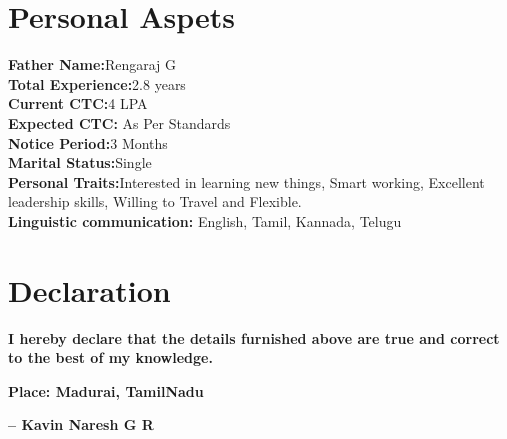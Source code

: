 \documentclass[letterpaper,12pt]{article}
\newcommand{\resumeSubHeadingListStart}{\begin{itemize}[leftmargin=0.15in, label={}]}
\newcommand{\resumeSubHeadingListEnd}{\end{itemize}}
\begin{document}
\section{Personal Aspets}
  \vspace{6pt}
  \resumeSubHeadingListStart
    \small{\item{
        
        \textbf{Father Name:}{Rengaraj G} \\ \vspace{3pt}
        \textbf{Total Experience:}{2.8 years} \\ \vspace{3pt}
        \textbf{Current CTC:}{4 LPA} \\ \vspace{3pt}
        \textbf{Expected CTC:}{ As Per Standards } \\ \vspace{3pt}
        \textbf{Notice Period:}{3 Months} \\ \vspace{3pt}
        \textbf{Marital Status:}{Single} \\ \vspace{3pt}
        \textbf{Personal Traits:}{Interested in learning new things, Smart working, Excellent leadership skills, Willing to Travel and Flexible.} \\ \vspace{3pt}
        \textbf{Linguistic communication:}{ English, Tamil, Kannada, Telugu} \\ \vspace{3pt}
    }}
  \resumeSubHeadingListEnd



\section{Declaration}
  \vspace{6pt}
  
  {\textbf{I hereby declare that the details furnished above are true and correct to the best of my knowledge.}}
  
  \begin{flushleft}
    \textbf{Place: Madurai, TamilNadu}
  \end{flushleft}
  
  \begin{flushright}
    \textbf{-- Kavin Naresh G R}
  \end{flushright}


\end{document}
